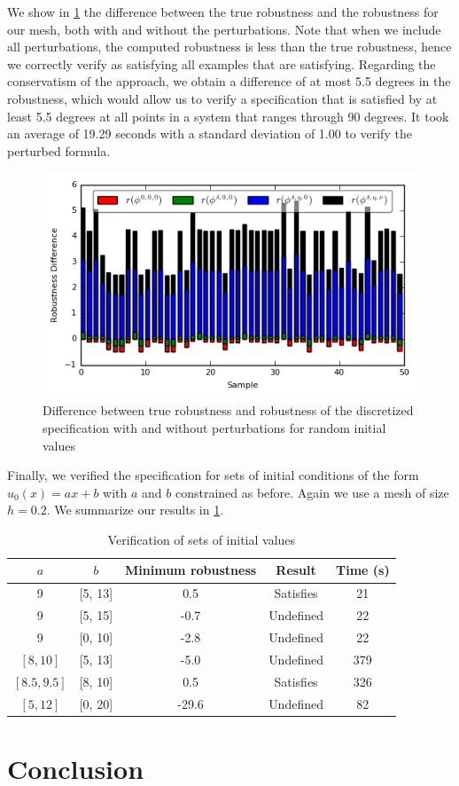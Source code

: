 \documentclass[oribibl]{llncs/llncs}
\begin{document}
We show in \cref{fig:res_diffs} the difference between the true robustness and
the robustness for our mesh, both with and without the perturbations. Note that
when we include all perturbations, the computed robustness is less than the true
robustness, hence we correctly verify as satisfying all examples
that are satisfying. Regarding the conservatism of the approach, we obtain a
difference of at most 5.5 degrees in the robustness, which would allow us to verify a
specification that is satisfied by at least 5.5 degrees at all points in a system
that ranges through 90 degrees. It took an average of 19.29 seconds with a
standard deviation of 1.00 to verify the perturbed formula.

\begin{figure}
    \centering
    \includegraphics[width=0.8\linewidth]{figures/cs_ran_init_results.png}
    \caption{Difference between true robustness and robustness of the
        discretized specification with and without perturbations for
        random initial values}
    \label{fig:res_diffs}
\end{figure}


Finally, we verified the specification for sets of initial conditions of the
form $u_0(x) = a x + b$ with $a$ and $b$ constrained as before. Again we use a
mesh of size $h = 0.2$. We summarize our results in \cref{tab:res_sets}.

\begin{table}
\centering
\begin{tabular}{|c|c|c|c|c|}
    \hline
    $a$ & $b$ & Minimum robustness & Result & Time (s)  \\
    \hline
    9 & [5, 13] & 0.5 & Satisfies & 21 \\
    9 & [5, 15] & -0.7 & Undefined & 22 \\
    9 & [0, 10] & -2.8 & Undefined & 22 \\
    $[8, 10]$ & [5, 13] & -5.0 & Undefined & 379 \\
    $[8.5, 9.5]$ & [8, 10] & 0.5 & Satisfies & 326 \\
    $[5, 12]$ & [0, 20] & -29.6 & Undefined & 82 \\
    \hline
\end{tabular}
\caption{Verification of sets of initial values}
\label{tab:res_sets}
\end{table}

\section{Conclusion}
\label{sec:conclusion}
\end{document}
